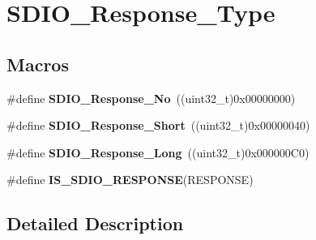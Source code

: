 \hypertarget{group___s_d_i_o___response___type}{\section{S\-D\-I\-O\-\_\-\-Response\-\_\-\-Type}
\label{group___s_d_i_o___response___type}
}
\subsection*{Macros}
\begin{DoxyCompactItemize}
\item 
\hypertarget{group___s_d_i_o___response___type_ga308b8ef0e79ba451644dda923bb3ac41}{\#define {\bfseries S\-D\-I\-O\-\_\-\-Response\-\_\-\-No}~((uint32\-\_\-t)0x00000000)}\label{group___s_d_i_o___response___type_ga308b8ef0e79ba451644dda923bb3ac41}

\item 
\hypertarget{group___s_d_i_o___response___type_ga1f61768f90641648fd5c12e8d2f7e508}{\#define {\bfseries S\-D\-I\-O\-\_\-\-Response\-\_\-\-Short}~((uint32\-\_\-t)0x00000040)}\label{group___s_d_i_o___response___type_ga1f61768f90641648fd5c12e8d2f7e508}

\item 
\hypertarget{group___s_d_i_o___response___type_ga1a11a8750612b344214f846784046bb0}{\#define {\bfseries S\-D\-I\-O\-\_\-\-Response\-\_\-\-Long}~((uint32\-\_\-t)0x000000\-C0)}\label{group___s_d_i_o___response___type_ga1a11a8750612b344214f846784046bb0}

\item 
\#define {\bfseries I\-S\-\_\-\-S\-D\-I\-O\-\_\-\-R\-E\-S\-P\-O\-N\-S\-E}(R\-E\-S\-P\-O\-N\-S\-E)
\end{DoxyCompactItemize}


\subsection{Detailed Description}


